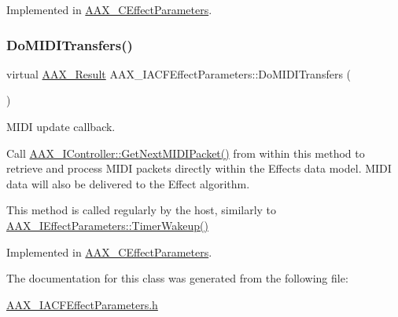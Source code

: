 Implemented in \mbox{\hyperlink{a01481_a2905b5ec2ef715cd9000c8f1902e13d3}{A\+A\+X\+\_\+\+C\+Effect\+Parameters}}.

\mbox{\label{a01669_af376aef3d3ecdc6287f820b4e01f5c9b}} 
\subsubsection{\texorpdfstring{DoMIDITransfers()}{DoMIDITransfers()}}
{\footnotesize\ttfamily virtual \mbox{\hyperlink{a00392_a4d8f69a697df7f70c3a8e9b8ee130d2f}{A\+A\+X\+\_\+\+Result}} A\+A\+X\+\_\+\+I\+A\+C\+F\+Effect\+Parameters\+::\+Do\+M\+I\+D\+I\+Transfers (\begin{DoxyParamCaption}{ }\end{DoxyParamCaption})\hspace{0.3cm}{\ttfamily [pure virtual]}}



M\+I\+DI update callback. 

Call \mbox{\hyperlink{a01789_a2896ba3a1ed86ce2813b1736d316d275}{A\+A\+X\+\_\+\+I\+Controller\+::\+Get\+Next\+M\+I\+D\+I\+Packet()}} from within this method to retrieve and process M\+I\+DI packets directly within the Effect\textquotesingle{}s data model. M\+I\+DI data will also be delivered to the Effect algorithm.

This method is called regularly by the host, similarly to \mbox{\hyperlink{a01669_ab5b8da9e1a9d778d327ac04f4ab8d139}{A\+A\+X\+\_\+\+I\+Effect\+Parameters\+::\+Timer\+Wakeup()}} 

Implemented in \mbox{\hyperlink{a01481_ae1076f7e181a6f66f0078bf31beb2cf1}{A\+A\+X\+\_\+\+C\+Effect\+Parameters}}.



The documentation for this class was generated from the following file\+:\begin{DoxyCompactItemize}
\item 
\mbox{\hyperlink{a00530}{A\+A\+X\+\_\+\+I\+A\+C\+F\+Effect\+Parameters.\+h}}\end{DoxyCompactItemize}
